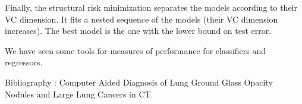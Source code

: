 \documentclass[a4paper,12pt]{article}
\begin{document}
Finally, the structural risk minimization separates the models according to their VC dimension. It fits a nested sequence of the models (their VC dimension increases). The best model is the one with the lower bound on test error.  

\vspace{10pt}
We have seen some tools for measures of performance for classifiers and regressors.
\vspace{60pt}


Bibliography : 
Computer Aided Diagnosis of Lung Ground Glass Opacity Nodules and Large Lung Cancers in CT.
\end{document}
